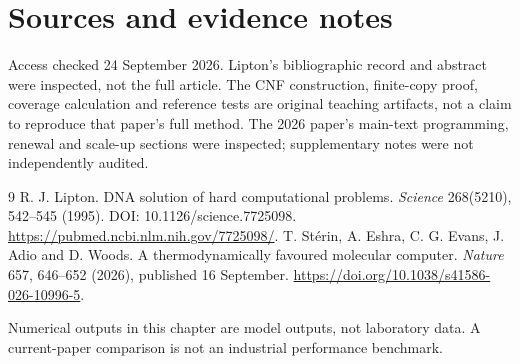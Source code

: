 \chapter*{Sources and evidence notes}
Access checked 24 September 2026. Lipton's bibliographic record and abstract
were inspected, not the full article. The CNF construction, finite-copy
proof, coverage calculation and reference tests are original teaching
artifacts, not a claim to reproduce that paper's full method.
The 2026 paper's main-text programming, renewal and scale-up sections were
inspected; supplementary notes were not independently audited.
\begingroup\let\chapter\section
\begin{thebibliography}{9}
 R. J. Lipton. DNA solution of hard computational problems.
\emph{Science} 268(5210), 542--545 (1995).
DOI: 10.1126/science.7725098.
\url{https://pubmed.ncbi.nlm.nih.gov/7725098/}.
 T. Stérin, A. Eshra, C. G. Evans, J. Adio and D. Woods.
A thermodynamically favoured molecular computer.
\emph{Nature} 657, 646--652 (2026), published 16 September.
\url{https://doi.org/10.1038/s41586-026-10996-5}.
\end{thebibliography}
\endgroup
Numerical outputs in this chapter are model outputs, not laboratory data.
A current-paper comparison is not an industrial performance benchmark.
